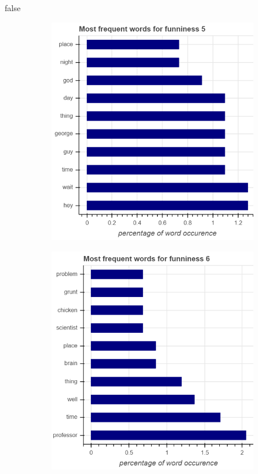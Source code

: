 \documentclass[draft,final,oneside]{vutinfth} %
\begin{document}
\if false

\begin{figure}
\centering

\begin{subfigure}[b]{0.45\textwidth}
\centering
\includegraphics[width=1.0\textwidth]{graphics/word_occurence/funniness_5}
\end{subfigure}\quad
\begin{subfigure}[b]{0.45\textwidth}
\centering
\includegraphics[width=1.0\textwidth]{graphics/word_occurence/funniness_6}
\end{subfigure}



\end{figure}
\end{document}
